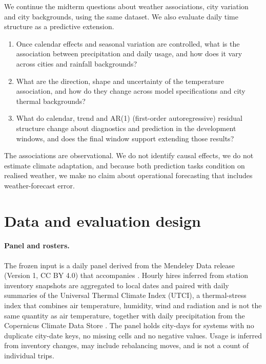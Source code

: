\documentclass{article}
\begin{document}
We continue the midterm questions about weather associations, city variation and city backgrounds,
using the same dataset. We also evaluate daily time structure as a predictive extension.

\begin{enumerate}
  \item Once calendar effects and seasonal variation are controlled, what is the association
        between precipitation and daily usage, and how does it vary across cities and rainfall
        backgrounds?
  \item What are the direction, shape and uncertainty of the temperature association, and how do
        they change across model specifications and city thermal backgrounds?
  \item What do calendar, trend and AR(1) (first-order autoregressive) residual structure change
        about diagnostics and prediction in the development windows, and does the final window
        support extending those results?
\end{enumerate}

The associations are observational. We do not identify causal effects, we do not estimate climate
adaptation, and because both prediction tasks condition on realised weather, we make no claim about
operational forecasting that includes weather-forecast error.

\section{Data and evaluation design}

\paragraph{Panel and rosters.}
The frozen input is a daily panel derived from the Mendeley Data release
\citep{mendeley2021bikeshare} (Version 1, CC BY 4.0) that accompanies \citet{bean2021weather}.
Hourly hires inferred from station inventory snapshots are aggregated to local dates and paired with
daily summaries of the Universal Thermal Climate Index (UTCI), a thermal-stress index that combines
air temperature, humidity, wind and radiation and is not the same quantity as air temperature,
together with daily precipitation from the Copernicus Climate Data Store \citep{cds2020utci}. The
panel holds \PanelRows{} city-days for \PanelCityCount{} systems with no duplicate city-date keys,
no missing cells and no negative values. Usage is inferred from inventory changes, may include
rebalancing moves, and is not a count of individual trips.
\end{document}
